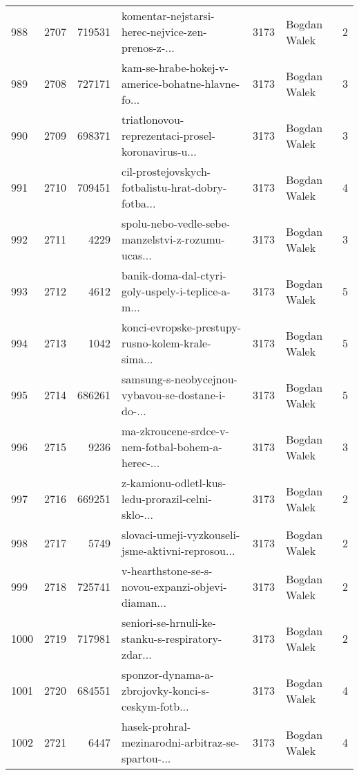 \begin{tabular}{lrrlrlr}
988  &       2707 &   719531 &  komentar-nejstarsi-herec-nejvice-zen-prenos-z-... &     3173 &                 Bogdan Walek &               2 \\
989  &       2708 &   727171 &  kam-se-hrabe-hokej-v-americe-bohatne-hlavne-fo... &     3173 &                 Bogdan Walek &               3 \\
990  &       2709 &   698371 &  triatlonovou-reprezentaci-prosel-koronavirus-u... &     3173 &                 Bogdan Walek &               3 \\
991  &       2710 &   709451 &  cil-prostejovskych-fotbalistu-hrat-dobry-fotba... &     3173 &                 Bogdan Walek &               4 \\
992  &       2711 &     4229 &  spolu-nebo-vedle-sebe-manzelstvi-z-rozumu-ucas... &     3173 &                 Bogdan Walek &               3 \\
993  &       2712 &     4612 &  banik-doma-dal-ctyri-goly-uspely-i-teplice-a-m... &     3173 &                 Bogdan Walek &               5 \\
994  &       2713 &     1042 &  konci-evropske-prestupy-rusno-kolem-krale-sima... &     3173 &                 Bogdan Walek &               5 \\
995  &       2714 &   686261 &  samsung-s-neobycejnou-vybavou-se-dostane-i-do-... &     3173 &                 Bogdan Walek &               5 \\
996  &       2715 &     9236 &  ma-zkroucene-srdce-v-nem-fotbal-bohem-a-herec-... &     3173 &                 Bogdan Walek &               3 \\
997  &       2716 &   669251 &  z-kamionu-odletl-kus-ledu-prorazil-celni-sklo-... &     3173 &                 Bogdan Walek &               2 \\
998  &       2717 &     5749 &  slovaci-umeji-vyzkouseli-jsme-aktivni-reprosou... &     3173 &                 Bogdan Walek &               2 \\
999  &       2718 &   725741 &  v-hearthstone-se-s-novou-expanzi-objevi-diaman... &     3173 &                 Bogdan Walek &               2 \\
1000 &       2719 &   717981 &  seniori-se-hrnuli-ke-stanku-s-respiratory-zdar... &     3173 &                 Bogdan Walek &               2 \\
1001 &       2720 &   684551 &  sponzor-dynama-a-zbrojovky-konci-s-ceskym-fotb... &     3173 &                 Bogdan Walek &               4 \\
1002 &       2721 &     6447 &  hasek-prohral-mezinarodni-arbitraz-se-spartou-... &     3173 &                 Bogdan Walek &               4 \\

\end{tabular}
